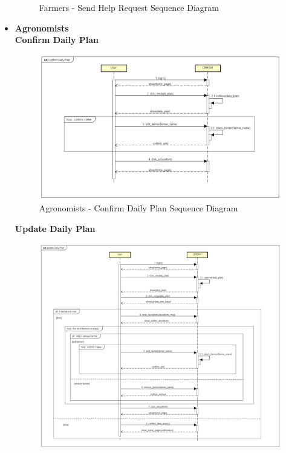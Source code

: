 \documentclass[table, 12pt]{article}
\begin{document}
\begin{itemize}
\begin{center}
\begin{figure}[H]
                    \caption{Farmers - Send Help Request Sequence Diagram}
                    \label{fig: sequence_helprequest}
                \end{figure}
            \end{center}

            \newpage
            \item \textbf{Agronomists}\\
            
            \textbf{Confirm Daily Plan}\\
            \begin{center}
                \begin{figure}[H]
                    \includegraphics[scale=0.55, center]{assets/Sequence diagrams/Agronomist/Confirm Daily Plan.png}
                    \caption{Agronomists - Confirm Daily Plan Sequence Diagram}
                    \label{fig: sdAgronomist_confirmDailyPlan}
                \end{figure}
            \end{center}
            \newpage
            \textbf{Update Daily Plan}\\
            \begin{center}
                \begin{figure}[H]
                    \includegraphics[scale=0.42, center]{assets/Sequence diagrams/Agronomist/Update Daily Plan.png}

\end{figure}
\end{center}
\end{itemize}
\end{document}
